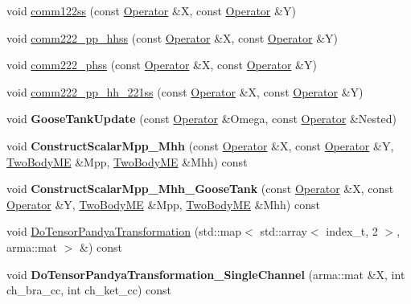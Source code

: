 \begin{DoxyCompactItemize}
\item 
void \hyperlink{classOperator_a4f4738296848a6d504c331456f361736}{comm122ss} (const \hyperlink{classOperator}{Operator} \&X, const \hyperlink{classOperator}{Operator} \&Y)
\item 
void \hyperlink{classOperator_ae040aa05d6a84031c90ba2259cbb05ae}{comm222\+\_\+pp\+\_\+hhss} (const \hyperlink{classOperator}{Operator} \&X, const \hyperlink{classOperator}{Operator} \&Y)
\item 
void \hyperlink{classOperator_a25b768c4ddceead49af1c7f69d5071ea}{comm222\+\_\+phss} (const \hyperlink{classOperator}{Operator} \&X, const \hyperlink{classOperator}{Operator} \&Y)
\item 
void \hyperlink{classOperator_adf70943fb0ad3c36ea27c1c14dc7f6ec}{comm222\+\_\+pp\+\_\+hh\+\_\+221ss} (const \hyperlink{classOperator}{Operator} \&X, const \hyperlink{classOperator}{Operator} \&Y)
\item 
\mbox{\label{classOperator_a14dd1e8d70ed6ac02dc2ae92172daa80}} 
void {\bfseries Goose\+Tank\+Update} (const \hyperlink{classOperator}{Operator} \&Omega, const \hyperlink{classOperator}{Operator} \&Nested)
\item 
\mbox{\label{classOperator_aa6eda337ff398e878eca2fc63ad5bf95}} 
void {\bfseries Construct\+Scalar\+Mpp\+\_\+\+Mhh} (const \hyperlink{classOperator}{Operator} \&X, const \hyperlink{classOperator}{Operator} \&Y, \hyperlink{classTwoBodyME}{Two\+Body\+ME} \&Mpp, \hyperlink{classTwoBodyME}{Two\+Body\+ME} \&Mhh) const
\item 
\mbox{\label{classOperator_a6da2e2205c8d45870c40ef22674caed7}} 
void {\bfseries Construct\+Scalar\+Mpp\+\_\+\+Mhh\+\_\+\+Goose\+Tank} (const \hyperlink{classOperator}{Operator} \&X, const \hyperlink{classOperator}{Operator} \&Y, \hyperlink{classTwoBodyME}{Two\+Body\+ME} \&Mpp, \hyperlink{classTwoBodyME}{Two\+Body\+ME} \&Mhh) const
\item 
void \hyperlink{classOperator_a9e538b3f99003fb5ba5912cfe57a8ada}{Do\+Tensor\+Pandya\+Transformation} (std\+::map$<$ std\+::array$<$ index\+\_\+t, 2 $>$, arma\+::mat $>$ \&) const
\item 
\mbox{\label{classOperator_ae2c3d8e85c78880e23625cc8362dba2b}} 
void {\bfseries Do\+Tensor\+Pandya\+Transformation\+\_\+\+Single\+Channel} (arma\+::mat \&X, int ch\+\_\+bra\+\_\+cc, int ch\+\_\+ket\+\_\+cc) const

\end{DoxyCompactItemize}
